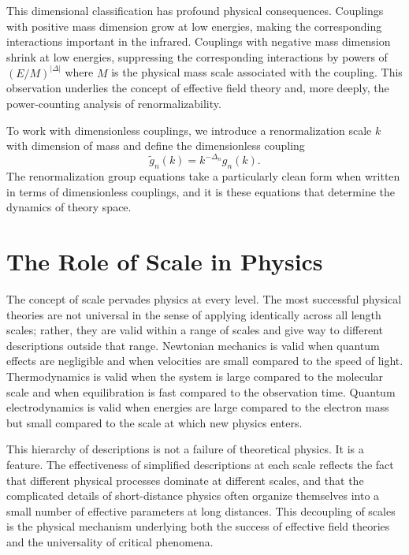 \documentclass[11pt, twoside, openright]{book}
\theoremstyle{dotted}
\theoremstyle{definition}
\begin{document}
This dimensional classification has profound physical consequences. Couplings with
positive mass dimension grow at low energies, making the corresponding interactions
important in the infrared. Couplings with negative mass dimension shrink at low
energies, suppressing the corresponding interactions by powers of $(E/M)^{|\Delta|}$
where $M$ is the physical mass scale associated with the coupling. This observation
underlies the concept of effective field theory and, more deeply, the power-counting
analysis of renormalizability.

To work with dimensionless couplings, we introduce a renormalization scale $k$
with dimension of mass and define the dimensionless coupling
\begin{equation}
  \tilde g_n(k) = k^{-\Delta_n} g_n(k).
  \label{eq:dimensionless_coupling}
\end{equation}
The renormalization group equations take a particularly clean form when written in
terms of dimensionless couplings, and it is these equations that determine the
dynamics of theory space.

\section{The Role of Scale in Physics}

The concept of scale pervades physics at every level. The most successful physical
theories are not universal in the sense of applying identically across all length
scales; rather, they are valid within a range of scales and give way to different
descriptions outside that range. Newtonian mechanics is valid when quantum effects
are negligible and when velocities are small compared to the speed of light.
Thermodynamics is valid when the system is large compared to the molecular scale
and when equilibration is fast compared to the observation time. Quantum
electrodynamics is valid when energies are large compared to the electron mass but
small compared to the scale at which new physics enters.

This hierarchy of descriptions is not a failure of theoretical physics. It is a
feature. The effectiveness of simplified descriptions at each scale reflects the
fact that different physical processes dominate at different scales, and that the
complicated details of short-distance physics often organize themselves into a
small number of effective parameters at long distances. This decoupling of scales
is the physical mechanism underlying both the success of effective field theories
and the universality of critical phenomena.
\end{document}
